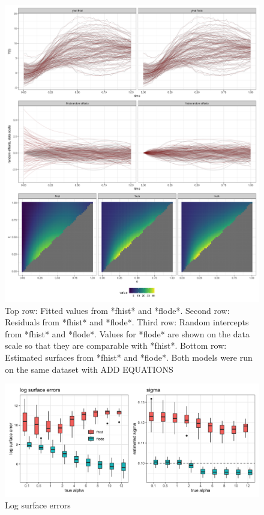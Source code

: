 \documentclass[preprint]{JASA}
\begin{document}
\begin{figure}
\includegraphics[width=\reprintcolumnwidth]{../output/fig_sim_results-1} \caption{Top row: Fitted values from *fhist* and *flode*. Second row: Residuals from *fhist* and *flode*.  Third row: Random intercepts from *fhist* and *flode*. Values for *flode* are shown on the data scale so that they are comparable with *fhist*. Bottom row: Estimated surfaces from *fhist* and *flode*. Both models were run on the same dataset with ADD EQUATIONS}\label{fig:sim_results}
\end{figure}

\begin{figure}
\includegraphics[width=\reprintcolumnwidth]{../output/fig_sim_surfaceErr-1} \caption{Log surface errors}\label{fig:sim_surfaceErr}
\end{figure}
\end{document}
